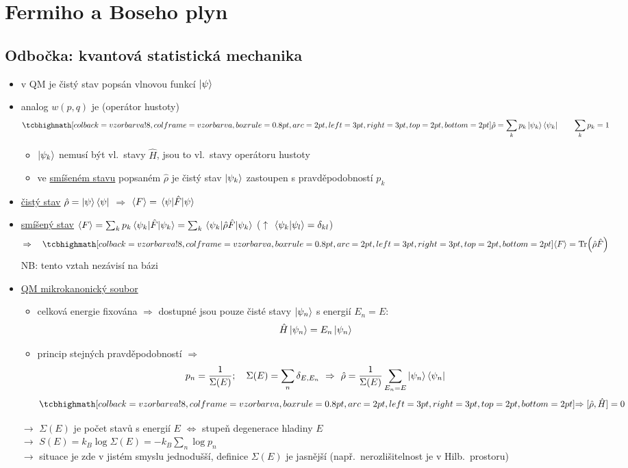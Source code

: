 \section{Fermiho a Boseho plyn}
\subsection{Odbočka: kvantová statistická mechanika}

\begin{itemize}
  \item v QM je čistý stav popsán vlnovou funkcí $\ket{\psi}$
  \item analog $w(p,q)$ je  (operátor hustoty)
  \[
    \vzorec{\hat\rho = \sum_k p_k\ket{\psi_k}\bra{\psi_k}} \qquad \sum_k p_k = 1
  \]
  \begin{itemize}
    \item $\ket{\psi_k}$ nemusí být vl.\ stavy $\hat H$, jsou to vl.\ stavy operátoru hustoty
    \item ve \underline{smíšeném stavu} popsaném $\hat\rho$ je čistý stav $\ket{\psi_k}$ zastoupen s pravděpodobností $p_k$
  \end{itemize}
  \item \underline{čistý stav} \quad $\hat\rho = \ket{\psi}\bra{\psi}$ \quad $\Rightarrow$ \quad $\langle F\rangle = \mel{\psi}{\hat F}{\psi}$
  \item \underline{smíšený stav} \quad
        $\langle F\rangle = \sum_k p_k\mel{\psi_k}{\hat F}{\psi_k} = \sum_k\mel{\psi_k}{\hat\rho\hat F}{\psi_k}$
        \quad ($\uparrow$ $\braket{\psi_k}{\psi_l} = \delta_{kl}$)
  \[
    \Rightarrow\quad \vzorec{\langle F\rangle = \Tr(\hat\rho\hat F)}
  \]
  NB: tento vztah nezávisí na bázi
  \item \underline{QM mikrokanonický soubor}
  \begin{itemize}
    \item[--] celková energie fixována $\Rightarrow$ dostupné jsou pouze čisté stavy $\ket{\psi_n}$ s energií $E_n = E$:
    \[ \hat H\ket{\psi_n} = E_n\ket{\psi_n} \]
    \item[--] princip stejných pravděpodobností $\Rightarrow$
    \[
      p_n = \frac{1}{\Sigma(E)}; \quad \Sigma(E) = \sum_n\delta_{E,E_n}
      \ \Rightarrow\ \hat\rho = \frac{1}{\Sigma(E)}\sum_{E_n = E}\ket{\psi_n}\bra{\psi_n}
    \]
    \[ \vzorec{\Rightarrow [\hat\rho,\hat H] = 0} \]
  \end{itemize}
  $\to$ $\Sigma(E)$ je počet stavů s energií $E$ $\Leftrightarrow$ stupeň degenerace hladiny $E$ \\
  $\to$ $S(E) = k_B\log\Sigma(E) = -k_B\sum_n\log p_n$ \\
  $\to$ situace je zde v jistém smyslu jednodušší, definice $\Sigma(E)$ je jasnější (např.\ nerozlišitelnost je  v Hilb.\ prostoru)
\end{itemize}

